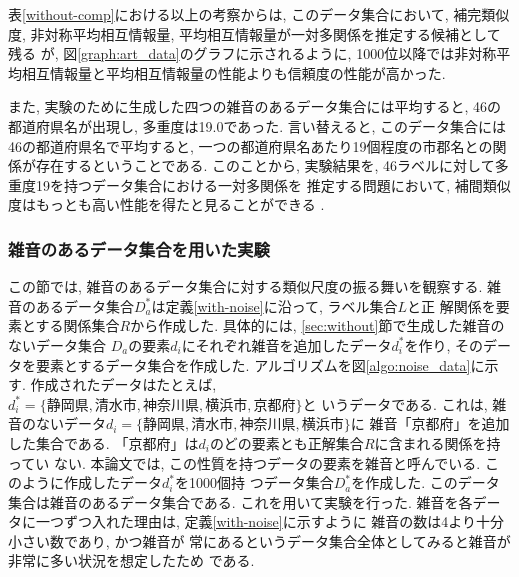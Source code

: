 表\ref{without-comp}における以上の考察からは, このデータ集合において, 
補完類似度, 非対称平均相互情報量, 平均相互情報量が一対多関係を推定する候補として残る
が, 図\ref{graph:art_data}のグラフに示されるように, 
1000位以降では非対称平均相互情報量と平均相互情報量の性能よりも信頼度の性能が高かった. 

また, 実験のために生成した四つの雑音のあるデータ集合には平均すると, 46の都道府県名が出現し, 
多重度は19.0であった. 
言い替えると, このデータ集合には46の都道府県名で平均すると, 
一つの都道府県名あたり19個程度の市郡名との関係が存在するということである. 
このことから, 実験結果を, 
46ラベルに対して多重度19を持つデータ集合における一対多関係を
推定する問題において, 補間類似度はもっとも高い性能を得たと見ることができる
. 

\subsubsection{雑音のあるデータ集合を用いた実験} \label{sec:with}
この節では, 雑音のあるデータ集合に対する類似尺度の振る舞いを観察する. 
雑音のあるデータ集合$D^*_a$は定義\ref{with-noise}に沿って, ラベル集合$L$と正
解関係を要素とする関係集合$R$から作成した. 具体的には, 
\ref{sec:without}節で生成した雑音のないデータ集合
$D_a$の要素$d_i$にそれぞれ雑音を追加したデータ$d^*_i$を作り, 
そのデータを要素とするデータ集合を作成した. 
アルゴリズムを図\ref{algo:noise_data}に示す. 
作成されたデータはたとえば, $d^*_i = \{静岡県, 清水市, 神奈川県, 横浜市, 京都府\}$と
いうデータである. 
これは, 雑音のないデータ$d_i = \{静岡県, 清水市, 神奈川県, 横浜市\}$に
雑音「京都府」を追加した集合である. 
「京都府」は$d_i$のどの要素とも正解集合$R$に含まれる関係を持ってい
ない. 本論文では, この性質を持つデータの要素を雑音と呼んでいる. 
このように作成したデータ$d^*_i$を1000個持
つデータ集合$D^*_a$を作成した. このデータ集合は雑音のあるデータ集合である. 
これを用いて実験を行った. 
雑音を各データに一つずつ入れた理由は, 定義\ref{with-noise}に示すように
雑音の数は4より十分小さい数であり, かつ雑音が
常にあるというデータ集合全体としてみると雑音が非常に多い状況を想定したため
である. 

